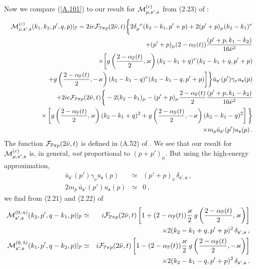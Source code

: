 \documentclass[a4paper,11pt]{article}
\newcommand{\nn}{\nonumber}
\newcommand{\Pom}{\mathbb{P}}
\begin{document}
Now we compare (\ref{A.101}) to our result for
${\cal M}^{(c)}_{\mu, \mathfrak{s'},\mathfrak{s}}$ from
(2.23) of \cite{Lebiedowicz:2025xob}:
%
\begin{eqnarray}
&&{\cal M}_{\mu, \mathfrak{s'},\mathfrak{s}}^{(c)}(k_{1},k_{2},p',q,p)|_{\Pom}
=
2ie 
{\cal F}_{\Pom \pi p}(2 \bar{\nu}, t)
\bigg{\lbrace}
2 \delta_{\mu}^{\;\;\nu} (k_{2} - k_{1}, p' + p)
+ 2 (p'+p)_{\mu} (k_{2} - k_{1})^{\nu}\nonumber\\
&& \quad 
+ (p'+p)_{\mu} (2 - \alpha_{\Pom}(t)) \frac{(p'+p,k_{1}-k_{2})}{16 \bar{\nu}^{2}}\nonumber\\
&& \quad  \times
\bigg{[}
g\left( \frac{2 - \alpha_{\Pom}(t)}{2}, \varkappa \right)
(k_{2} - k_{1} + q)^{\nu}(k_{2}-k_{1}+q,p'+p) \nonumber\\
&& \quad 
+
g\left( \frac{2 - \alpha_{\Pom}(t)}{2}, -\varkappa \right)
(k_{2} - k_{1} - q)^{\nu}(k_{2}-k_{1}-q,p'+p)
\bigg{]}
\bigg{\rbrace} 
\bar{u}_{\mathfrak{s'}}(p') \gamma_{\nu} u_{\mathfrak{s}}(p) \nonumber\\
&& \quad +
2ie {\cal F}_{\Pom \pi p}(2 \bar{\nu}, t)
\bigg{\lbrace}
- 2 (k_{2} - k_{1})_{\mu} 
- (p'+p)_{\mu} \frac{2 - \alpha_{\Pom}(t)}{2} \frac{(p'+p,k_{1}-k_{2})}{16 \bar{\nu}^{2}}\nonumber\\
&& \quad \times
\left[
g\left( \frac{2 - \alpha_{\Pom}(t)}{2}, \varkappa \right)
(k_{2}-k_{1}+q)^{2} +
g\left( \frac{2 - \alpha_{\Pom}(t)}{2},-\varkappa \right)
(k_{2}-k_{1}-q)^{2} 
\right] 
\bigg{\rbrace} \nonumber \\
&& \quad \times
m_{p} \bar{u}_{\mathfrak{s'}}(p') u_{\mathfrak{s}}(p)\,.
\label{A.102}
\end{eqnarray}
%
The function ${\cal F}_{\Pom \pi p}(2 \bar{\nu}, t)$ 
is defined in (A.52) of \cite{Lebiedowicz:2025xob}.
We see that our result for
${\cal M}^{(c)}_{\mu, \mathfrak{s'},\mathfrak{s}}$
is, in general, \textit{not} proportional to $(p + p')_{\mu}$.
But using the high-energy approximation,
%
\begin{eqnarray}
\bar{u}_{\mathfrak{s'}}(p') \gamma_{\nu} u_{\mathfrak{s}}(p) &\simeq& (p' + p)_{\nu}\, \delta_{\mathfrak{s'},\mathfrak{s}}\,, \nn \\
2 m_{p} \, \bar{u}_{\mathfrak{s'}}(p') u_{\mathfrak{s}}(p) &\simeq& 0\,,
\label{A.2} 
\end{eqnarray}
%
we find from (2.21) and (2.22) of \cite{Lebiedowicz:2025xob}
%
\begin{eqnarray}
{\cal M}_{\mathfrak{s'},\mathfrak{s}}^{(0, \,a)}(k_{2},p',q-k_{1},p)|_{\Pom} 
&\simeq &
i{\cal F}_{\Pom \pi p}(2 \bar{\nu}, t)
\left[
1 + (2 - \alpha_{\Pom}(t)) \frac{\varkappa}{2} \,
g\left( \frac{2 - \alpha_{\Pom}(t)}{2}, \varkappa \right)
\right] \nonumber\\
&& \times
2(k_{2}-k_{1}+q, p'+p)^{2} \,
\delta_{\mathfrak{s'},\mathfrak{s}} \,,
\label{A.3} \\
{\cal M}_{\mathfrak{s'},\mathfrak{s}}^{(0,\,b)}(k_{1},p',q-k_{2},p)|_{\Pom}&\simeq &
i{\cal F}_{\Pom \pi p}(2 \bar{\nu}, t)
\left[
1 - (2 - \alpha_{\Pom}(t)) \frac{\varkappa}{2} \,
g\left( \frac{2 - \alpha_{\Pom}(t)}{2}, -\varkappa \right)
\right] \nonumber\\
&& \times
2(k_{2}-k_{1}-q, p'+p)^{2} \,
\delta_{\mathfrak{s'},\mathfrak{s}}\,.
\label{A.4}
\end{eqnarray}
\end{document}
